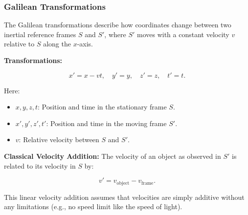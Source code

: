 \documentclass{article}
\newcommand{\eqbox}[1]{\begin{tcolorbox}[colback=gray!10] #1 \end{tcolorbox}}
\newcommand{\conceptbox}[1]{\begin{tcolorbox}[colback=blue!10] #1 \end{tcolorbox}}
\begin{document}
\subsubsection{Galilean Transformations}
\conceptbox{
The Galilean transformations describe how coordinates change between two inertial reference frames \( S \) and \( S' \), where \( S' \) moves with a constant velocity \( v \) relative to \( S \) along the \( x \)-axis.

\textbf{Transformations:}
\eqbox{
\[
    x' = x - vt, \quad y' = y, \quad z' = z, \quad t' = t.
\]
}
Here:
\begin{itemize}
    \item \( x, y, z, t \): Position and time in the stationary frame \( S \).
    \item \( x', y', z', t' \): Position and time in the moving frame \( S' \).
    \item \( v \): Relative velocity between \( S \) and \( S' \).
\end{itemize}
}

\conceptbox{
\textbf{Classical Velocity Addition:}
The velocity of an object as observed in \( S' \) is related to its velocity in \( S \) by:
\eqbox{
\[
    v' = v_{\text{object}} - v_{\text{frame}}.
\]
}
This linear velocity addition assumes that velocities are simply additive without any limitations (e.g., no speed limit like the speed of light).
}
\end{document}
